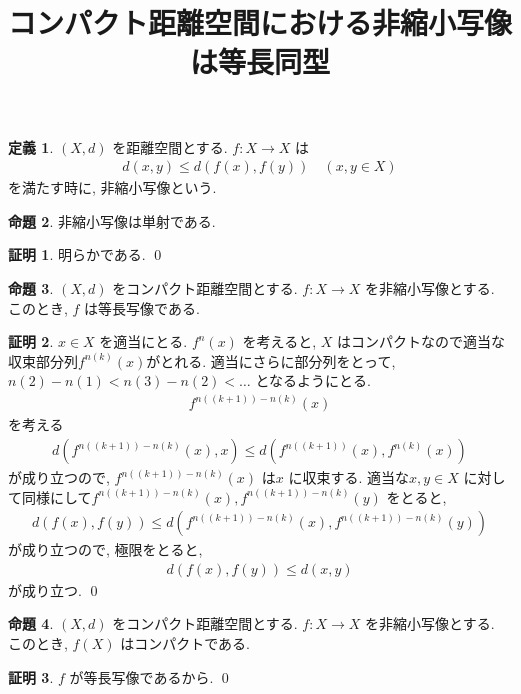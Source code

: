 \documentclass[10pt, fleqn, label-section=none]{bxjsarticle}
\title{コンパクト距離空間における非縮小写像は等長同型}
\date{}
\author{}
\theoremstyle{definition}
\newtheorem{dfn}{定義}[section]
\newtheorem{prop}[dfn]{命題}
\newtheorem*{pf*}{証明}
\renewcommand{\;}{\, ; \,}
\begin{document}
\maketitle

\section{}

\begin{dfn}$(X, d)$ を距離空間とする. $f: X \rightarrow X$ は
\begin{align*} d(x, y) \leq d(f(x) , f(y)) \quad (x, y \in X) \end{align*}
を満たす時に, 非縮小写像という. 
\end{dfn}

\begin{prop}非縮小写像は単射である. 

\end{prop}
\begin{pf*}
明らかである. 
\qed
\end{pf*}

\begin{prop}$(X, d)$ をコンパクト距離空間とする. $f: X \rightarrow X$ を非縮小写像とする. このとき, $f$ は等長写像である. 

\end{prop}
\begin{pf*}$x \in X$ を適当にとる. $f^n (x)$ を考えると, $X$ はコンパクトなので適当な収束部分列$f^{n(k)}(x)$がとれる. 適当にさらに部分列をとって, $n(2) - n(1) < n(3) - n(2) <  \ldots$ となるようにとる.  
\begin{align*} f^{n((k+1)) - n(k)}(x) \end{align*}
を考える
\begin{align*}   d(f^{n((k+1)) - n(k)}(x), x) \leq d(f^{n((k+1))}(x), f^{n(k)}(x) )   \end{align*}
が成り立つので, $f^{n((k+1)) - n(k)}(x) $ は$x$ に収束する. 
適当な$x, y \in X$ に対して同様にして$f^{n((k+1)) - n(k)}(x) , f^{n((k+1)) - n(k)}(y) $ をとると, 
\begin{align*} d(f(x), f(y)) \leq d(f^{n((k+1)) - n(k)}(x) , f^{n((k+1)) - n(k)}(y) ) \end{align*}
が成り立つので, 極限をとると, 
\begin{align*} d(f(x), f(y)) \leq d(x, y) \end{align*}
が成り立つ. 
\qed
\end{pf*}


\begin{prop}$(X, d)$ をコンパクト距離空間とする. $f: X \rightarrow X$ を非縮小写像とする. このとき, $f(X)$ はコンパクトである. 
\end{prop}
\begin{pf*} $f$ が等長写像であるから. 
\qed
\end{pf*}
\end{document}

